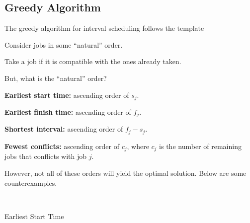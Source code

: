 \subsection{Greedy Algorithm}

The greedy algorithm for interval scheduling follows the template
\begin{listu}
    \item Consider jobs in some ``natural'' order.
    \item Take a job if it is compatible with the ones already taken.
\end{listu}

But, what is the ``natural'' order?
\begin{listu}
    \item \textbf{Earliest start time:} ascending order of $s_j$.
    \item \textbf{Earliest finish time:} ascending order of $f_j$.
    \item \textbf{Shortest interval:} ascending order of $f_j - s_j$.
    \item \textbf{Fewest conflicts:} ascending order of $c_j$, where $c_j$ is the number of remaining jobs that conflicts with job $j$.
\end{listu}

However, not all of these orders will yield the optimal solution. Below are some counterexamples.

{~~~}

\begin{minipage}[t]{0.55\linewidth}
    \begin{center} \tikzexternalenable {} \tikzexternaldisable \end{center}
\end{minipage}
\begin{minipage}[t]{0.35\linewidth}
    \begin{center}
        Earliest Start Time
    \end{center}
\end{minipage}

